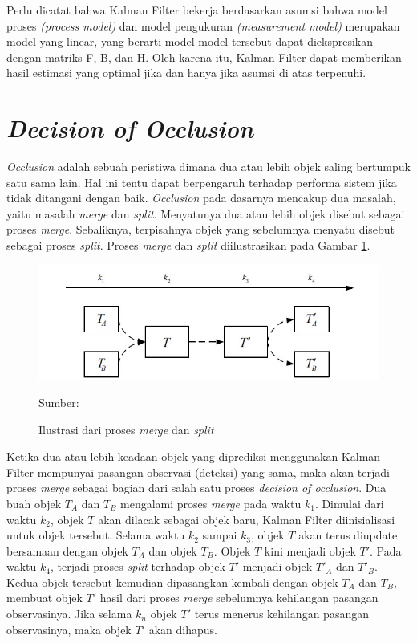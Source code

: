         Perlu dicatat bahwa Kalman Filter bekerja berdasarkan asumsi bahwa model proses \textit{(process model)} dan model pengukuran \textit{(measurement model)} merupakan model yang linear, yang berarti model-model tersebut dapat diekspresikan dengan matriks F, B, dan H. Oleh karena itu, Kalman Filter dapat memberikan hasil estimasi yang optimal jika dan hanya jika asumsi di atas terpenuhi.
        
\section{\textit{Decision of Occlusion}}
    \textit{Occlusion} adalah sebuah peristiwa dimana dua atau lebih objek saling bertumpuk satu sama lain. Hal ini tentu dapat berpengaruh terhadap performa sistem jika tidak ditangani dengan baik. \textit{Occlusion} pada dasarnya mencakup dua masalah, yaitu masalah \textit{merge} dan \textit{split}. Menyatunya dua atau lebih objek disebut sebagai proses \textit{merge}. Sebaliknya, terpisahnya objek yang sebelumnya menyatu disebut sebagai proses \textit{split}. Proses \textit{merge} dan \textit{split} diilustrasikan pada Gambar \ref{fig:mergesplit}.
    \begin{figure}[H]
    \centering
      \singlespacing
      \captionsetup{justification=centering,margin=0.5cm}
      \includegraphics[width=12cm]{image/mergesplit-02.jpg}
      \caption{Ilustrasi dari proses \textit{merge} dan \textit{split}}
      \small{Sumber: \citep{Li2010}}
      \label{fig:mergesplit}
    \end{figure}
    
    Ketika dua atau lebih keadaan objek yang diprediksi menggunakan Kalman Filter mempunyai pasangan observasi (deteksi) yang sama, maka akan terjadi proses \textit{merge} sebagai bagian dari salah satu proses \textit{decision of occlusion}. Dua buah objek $T_A$ dan $T_B$ mengalami proses \textit{merge} pada waktu $k_1$. Dimulai dari waktu $k_2$, objek $T$ akan dilacak sebagai objek baru, Kalman Filter diinisialisasi untuk objek tersebut. Selama waktu $k_2$ sampai $k_3$, objek $T$ akan terus diupdate bersamaan dengan objek $T_A$ dan objek $T_B$. Objek $T$ kini menjadi objek $T'$. Pada waktu $k_4$, terjadi proses \textit{split} terhadap objek $T'$ menjadi objek $T'_A$ dan $T'_B$. Kedua objek tersebut kemudian dipasangkan kembali dengan objek $T_A$ dan $T_B$, membuat objek $T'$ hasil dari proses \textit{merge} sebelumnya kehilangan pasangan observasinya. Jika selama $k_n$ objek $T'$ terus menerus kehilangan pasangan observasinya, maka objek $T'$ akan dihapus.
    
